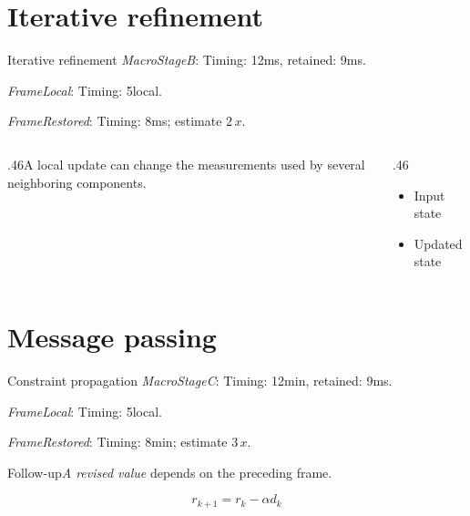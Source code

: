 \documentclass[9pt,aspectratio=169]{beamer}
\newcommand{\fuzzlayerA}[1]{\textit{#1}}
\newcommand{\fuzzlayerB}[1]{\fuzzlayerA{#1}}
\newcommand{\fuzzterm}[1]{\fuzzlayerB{#1}}
\newcommand{\fuzzpair}[2]{\fuzzterm{#1}: #2}
\newcommand{\fuzzunit}{ms}
\let\fuzzoriginalunit\fuzzunit
\newcommand{\fuzzcoefficient}{2}
\newcommand{\fuzzscale}[2][\fuzzcoefficient]{#1\,#2}
\begin{document}
\section{Iterative refinement}
\begin{frame}[t]{Iterative refinement}
\fuzzpair{MacroStageB}{Timing: 12\fuzzunit, retained: 9\fuzzoriginalunit.}\par
{\renewcommand{\fuzzunit}{local}\fuzzpair{FrameLocal}{Timing: 5\fuzzunit.}\par}
\fuzzpair{FrameRestored}{Timing: 8\fuzzunit; estimate $\fuzzscale{x}$.}\par
\begin{columns}[T]\begin{column}{.46\textwidth}A local update can change the measurements used by several neighboring components.\end{column}\begin{column}{.46\textwidth}\begin{itemize}\item Input state\item Updated state\end{itemize}\end{column}\end{columns}
\end{frame}
\renewcommand{\fuzzunit}{min}
\renewcommand{\fuzzcoefficient}{3}
\renewcommand{\fuzzterm}[1]{{\textit{#1}}}
\section{Message passing}
\begin{frame}[t]{Constraint propagation}
\fuzzpair{MacroStageC}{Timing: 12\fuzzunit, retained: 9\fuzzoriginalunit.}\par
{\renewcommand{\fuzzunit}{local}\fuzzpair{FrameLocal}{Timing: 5\fuzzunit.}\par}
\fuzzpair{FrameRestored}{Timing: 8\fuzzunit; estimate $\fuzzscale{x}$.}\par
\begin{block}{Follow-up}\fuzzterm{A revised value} depends on the preceding frame.\end{block}
\[r_{k+1}=r_k-\alpha d_k\]
\end{frame}
\end{document}
